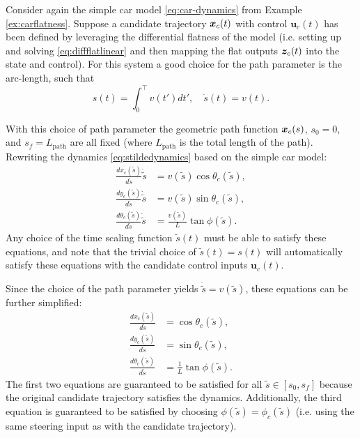 \begin{example}
\theoremstyle{definition} Consider again the simple car model \eqref{eq:car-dynamics} from Example \ref{ex:carflatness}. Suppose a candidate trajectory $\bm{x}_c(t)$ with control $\bm{u}_c(t)$ has been defined by leveraging the differential flatness of the model (i.e. setting up and solving \eqref{eq:diffflatlinear} and then mapping the flat outputs $\bm{z}_c(t)$ into the state and control). For this system a good choice for the path parameter is the arc-length, such that
\begin{equation*}
    s(t) = \int_0^\top  v(t') dt', \quad \dot{s}(t) = v(t).
\end{equation*}

With this choice of path parameter the geometric path function $\bm{x}_c(s)$, $s_0 = 0$, and $s_f = L_{\text{path}}$ are all fixed (where $L_{\text{path}}$ is the total length of the path). Rewriting the dynamics \eqref{eq:stildedynamics} based on the simple car model:
\begin{equation*}
\begin{split}
\frac{dx_c(\tilde{s})}{d\tilde{s}}\dot{\tilde{s}} &= v(\tilde{s})\cos\theta_c(\tilde{s}),\\
\frac{dy_c(\tilde{s})}{d\tilde{s}}\dot{\tilde{s}}&= v(\tilde{s})\sin\theta_c(\tilde{s}),\\
\frac{d\theta_c(\tilde{s})}{d\tilde{s}}\dot{\tilde{s}} &= \frac{v(\tilde{s})}{L}\tan\phi(\tilde{s}).
\end{split}
\end{equation*}
Any choice of the time scaling function $\tilde{s}(t)$ must be able to satisfy these equations, and note that the trivial choice of $\tilde{s}(t) = s(t)$ will automatically satisfy these equations with the candidate control inputs $\bm{u}_c(t)$. 

Since the choice of the path parameter yields $\dot{\tilde{s}} = v(\tilde{s})$, these equations can be further simplified:
\begin{equation*}
\begin{split}
\frac{dx_c(\tilde{s})}{d\tilde{s}} &= \cos\theta_c(\tilde{s}),\\
\frac{dy_c(\tilde{s})}{d\tilde{s}}&= \sin\theta_c(\tilde{s}),\\
\frac{d\theta_c(\tilde{s})}{d\tilde{s}} &= \frac{1}{L}\tan\phi(\tilde{s}).
\end{split}
\end{equation*}
The first two equations are guaranteed to be satisfied for all $\tilde{s} \in [s_0, s_f]$ because the original candidate trajectory satisfies the dynamics. Additionally, the third equation is guaranteed to be satisfied by choosing $\phi(\tilde{s}) = \phi_c(\tilde{s})$ (i.e. using the same steering input as with the candidate trajectory).


\end{example}
